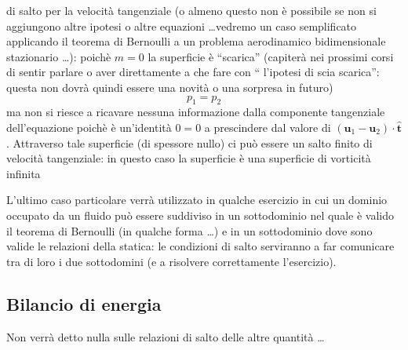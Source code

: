 \begin{itemize}
  di salto per la velocità tangenziale (o almeno questo non è possibile se non si aggiungono altre ipotesi o altre equazioni \dots vedremo 
  un caso semplificato applicando il teorema di Bernoulli a un problema aerodinamico bidimensionale stazionario \dots):
  poichè $m=0$ la superficie è ``scarica'' (capiterà nei prossimi corsi di sentir parlare o aver direttamente a che fare con ``
  l'ipotesi di scia scarica'': questa non dovrà quindi essere una novità o una sorpresa in futuro)
  \begin{equation}
    p_1 = p_2
  \end{equation}
  ma non si riesce a ricavare nessuna informazione dalla componente tangenziale
  dell'equazione poichè è un'identità $0=0$ a prescindere dal valore di $( \bm{u}_1 - \bm{u}_2 )\cdot \bm{\hat{t}}$. Attraverso tale superficie
  (di spessore nullo) ci può essere un salto finito di velocità tangenziale: in questo caso la superficie è una superficie di vorticità infinita
\end{itemize}

\noindent
L'ultimo caso particolare verrà utilizzato in qualche esercizio in cui un dominio occupato da un fluido può essere suddiviso in un sottodominio 
 nel quale è valido il teorema di Bernoulli (in qualche forma \dots) e in un sottodominio dove sono valide le relazioni della statica: le condizioni
 di salto serviranno a far comunicare tra di loro i due sottodomini (e a risolvere correttamente l'esercizio).

\subsection{Bilancio di energia}
Non verrà detto nulla sulle relazioni di salto delle altre quantità \dots

